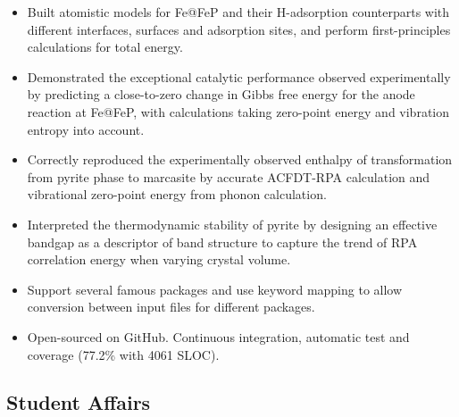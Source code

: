 {
    \begin{itemize}
        \item Built atomistic models for Fe@FeP and their H-adsorption counterparts with different interfaces, surfaces and adsorption sites, and perform first-principles calculations for total energy.
        \item Demonstrated the exceptional catalytic performance observed experimentally by predicting a close-to-zero change in Gibbs free energy for the anode reaction at Fe@FeP, with calculations taking zero-point energy and vibration entropy into account.
    \end{itemize}
}

{
    \begin{itemize}%
        \item Correctly reproduced the experimentally observed enthalpy of transformation from  pyrite phase to marcasite by accurate ACFDT-RPA calculation and vibrational zero-point energy from phonon calculation.
        \item Interpreted the thermodynamic stability of pyrite by  designing an effective bandgap as a descriptor of band structure to capture the trend of RPA correlation energy when varying crystal volume.
    \end{itemize}
}

{
    \begin{itemize}%
        \item Support several famous packages and use keyword mapping to allow conversion between input files for different packages.
        \item Open-sourced on GitHub. Continuous integration, automatic test and coverage (77.2\% with 4061 SLOC).
    \end{itemize}
}

\subsection{Student Affairs}
{
{
}
}

